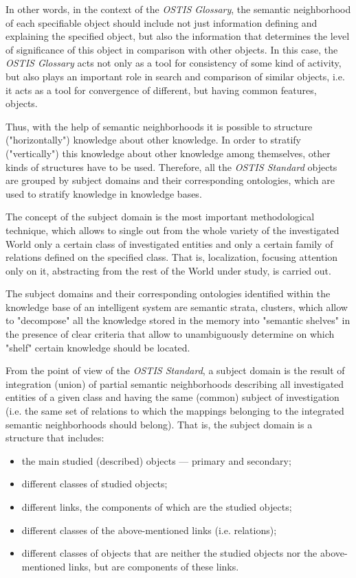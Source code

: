 \documentclass{scndocument}
\begin{document}
\begin{multicols}{2}
    In other words, in the context of the \textit{OSTIS Glossary}, the semantic neighborhood of each specifiable object should include not just information defining and explaining the specified object, but also the information that determines the level of significance of this object in comparison with other objects. In this case, the \textit{OSTIS Glossary} acts not only as a tool for consistency of some kind of activity, but also plays an important role in search and comparison of similar objects, i.e. it acts as a tool for convergence of different, but having common features, objects.
    
    Thus, with the help of semantic neighborhoods it is possible to structure ("horizontally") knowledge about other knowledge. In order to stratify ("vertically") this knowledge about other knowledge among themselves, other kinds of structures have to be used. Therefore, all the \textit{OSTIS Standard} objects are grouped by subject domains and their corresponding ontologies, which are used to stratify knowledge in knowledge bases.

    The concept of the subject domain is the most important methodological technique, which allows to single out from the whole variety of the investigated World only a certain class of investigated entities and only a certain family of relations defined on the specified class. That is, localization, focusing attention only on it, abstracting from the rest of the World under study, is carried out.

    The subject domains and their corresponding ontologies identified within the knowledge base of an intelligent system are semantic strata, clusters, which allow to "decompose" all the knowledge stored in the memory into "semantic shelves" in the presence of clear criteria that allow to unambiguously determine on which "shelf" certain knowledge should be located.

    From the point of view of the \textit{OSTIS Standard}, a subject domain is the result of integration (union) of partial semantic neighborhoods describing all investigated entities of a given class and having the same (common) subject of investigation (i.e. the same set of relations to which the mappings belonging to the integrated semantic neighborhoods should belong). That is, the subject domain is a structure that includes:
    \begin{itemize}
        \item the main studied (described) objects — primary and secondary;
        \item different classes of studied objects;
        \item different links, the components of which are the studied objects;
        \item different classes of the above-mentioned links (i.e. relations);
        \item different classes of objects that are neither the studied objects nor the above-mentioned links, but are components of these links.
    \end{itemize}


\end{multicols}
\end{document}
